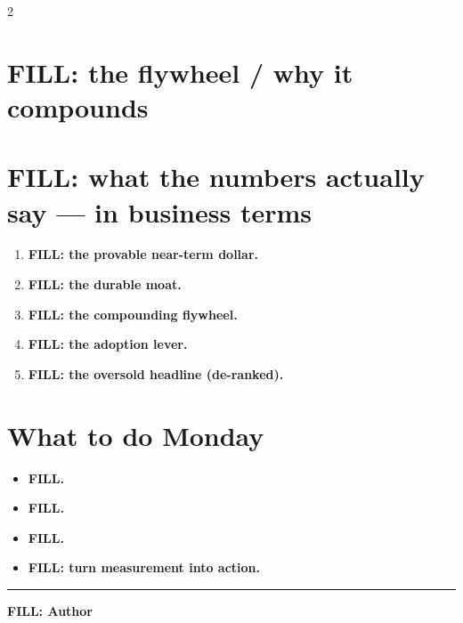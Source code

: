 \documentclass[10pt]{article}
\begin{document}
\begin{multicols}{2}

\section*{FILL: the flywheel / why it compounds}

\section*{FILL: what the numbers actually say — in business terms}
\begin{enumerate}[leftmargin=1.4em, itemsep=2pt]
\item \textbf{FILL: the provable near-term dollar.} %
\item \textbf{FILL: the durable moat.} %
\item \textbf{FILL: the compounding flywheel.} %
\item \textbf{FILL: the adoption lever.} %
\item \textbf{FILL: the oversold headline (de-ranked).} %
\end{enumerate}

\section*{What to do Monday}
\begin{itemize}[leftmargin=1.2em, itemsep=2pt]
\item \textbf{FILL.} %
\item \textbf{FILL.} %
\item \textbf{FILL.} %
\item \textbf{FILL: turn measurement into action.} %
\end{itemize}


\end{multicols}

\vspace{2mm}
\noindent\rule{\textwidth}{0.4pt}

\footnotesize\sffamily\color{hbrgray}
\textbf{FILL: Author} %
\end{document}
